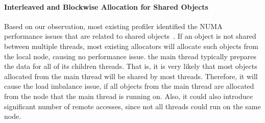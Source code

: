 \paragraph{Interleaved and Blockwise Allocation  for Shared Objects} Based on our observation, most existing profiler identified the NUMA performance issues that are related to shared objects~\cite{}. If an object is not shared between multiple threads, most existing allocators will allocate such objects from the local node, causing no performance issue.   the main thread typically prepares the data for all of its children threads. That is, it is very likely that most objects allocated from the main thread will be shared by most threads. Therefore, it will cause the load imbalance issue, if all objects from the main thread are allocated from the node that the main thread is running on. Also, it could also introduce significant number of remote accesses, since not all threads could run on the same node.  



